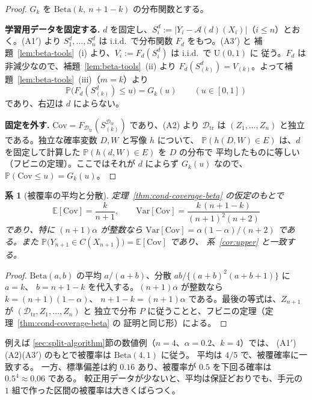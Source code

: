 \documentclass[a4paper,11pt]{jsarticle}
\theoremstyle{definition}
\theoremstyle{plain}
\newtheorem{corollary}[definition]{系}
\theoremstyle{remark}
\newcommand{\Prob}{\mathbb{P}}
\newcommand{\Exp}{\mathbb{E}}
\newcommand{\Dtr}{\mathcal{D}_{\mathrm{tr}}}     %
\begin{document}
\begin{proof}
  $G_k$ を $\mathrm{Beta}(k,\ n+1-k)$ の分布関数とする。

  \textbf{学習用データを固定する.}
  $d$ を固定し、$S_i^d:=|Y_i-\mathcal{A}(d)(X_i)|$（$i\le n$）とおく。(A1$'$) より
  $S_1^d,\dots,S_n^d$ は i.i.d.\ で分布関数 $F_d$ をもつ。(A3$'$) と
  補題~\ref{lem:beta-tools}~(i) より、$V_i:=F_d(S_i^d)$ は i.i.d.\ で $\mathrm{U}(0,1)$ に
  従う。$F_d$ は非減少なので、補題~\ref{lem:beta-tools}~(ii) より
  $F_d(S^d_{(k)})=V_{(k)}$。よって補題~\ref{lem:beta-tools}~(iii)（$m=k$）より
  \begin{equation*}
    \Prob\bigl(F_d(S^d_{(k)})\le u\bigr)=G_k(u)\qquad(u\in[0,1])
  \end{equation*}
  であり、右辺は $d$ によらない。

  \textbf{固定を外す.}
  $\mathrm{Cov}=F_{\Dtr}(S^{\Dtr}_{(k)})$ であり、(A2) より $\Dtr$ は
  $(Z_1,\dots,Z_n)$ と独立である。独立な確率変数 $D,W$ と写像 $h$ について、
  $\Prob(h(D,W)\in E)$ は、$d$ を固定して計算した $\Prob(h(d,W)\in E)$ を $D$ の分布で
  平均したものに等しい（フビニの定理）。ここではそれが $d$ によらず $G_k(u)$ なので、
  $\Prob(\mathrm{Cov}\le u)=G_k(u)$。
\end{proof}

\begin{corollary}[被覆率の平均と分散]
  \label{cor:cond-coverage-moments}
  定理~\ref{thm:cond-coverage-beta} の仮定のもとで
  \begin{equation}
    \label{eq:cond-coverage-moments}
    \Exp[\mathrm{Cov}]=\frac{k}{n+1},\qquad
    \mathrm{Var}[\mathrm{Cov}]=\frac{k\,(n+1-k)}{(n+1)^2(n+2)}
  \end{equation}
  であり、特に $(n+1)\alpha$ が整数なら $\mathrm{Var}[\mathrm{Cov}]=\alpha(1-\alpha)/(n+2)$
  である。また $\Prob\bigl(Y_{n+1}\in C(X_{n+1})\bigr)=\Exp[\mathrm{Cov}]$ であり、
  系~\ref{cor:upper} と一致する。
\end{corollary}

\begin{proof}
  $\mathrm{Beta}(a,b)$ の平均 $a/(a+b)$、分散 $ab/\{(a+b)^2(a+b+1)\}$ に $a=k$、
  $b=n+1-k$ を代入する。$(n+1)\alpha$ が整数なら $k=(n+1)(1-\alpha)$、
  $n+1-k=(n+1)\alpha$ である。最後の等式は、$Z_{n+1}$ が $(\Dtr,Z_1,\dots,Z_n)$ と
  独立で分布 $P$ に従うことと、フビニの定理（定理~\ref{thm:cond-coverage-beta} の
  証明と同じ形）による。
\end{proof}

例えば \ref{sec:split-algorithm}節の数値例（$n=4$、$\alpha=0.2$、$k=4$）では、
(A1$'$)(A2)(A3$'$) のもとで被覆率は $\mathrm{Beta}(4,1)$ に従う。
平均は $4/5$ で、被覆確率に一致する。
一方、標準偏差は約 $0.16$ あり、被覆率が $0.5$ を下回る確率は $0.5^4\approx0.06$ である。
較正用データが少ないと、平均は保証どおりでも、手元の $1$ 組で作った区間の被覆率は大きくばらつく。
\end{document}
